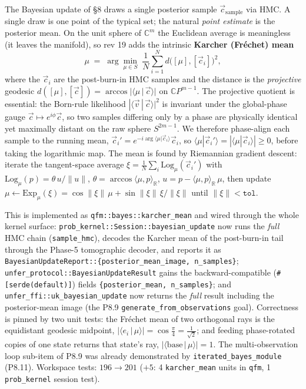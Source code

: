 \documentclass[11pt, a4paper]{article}
\newcommand{\Rset}{\mathbb{R}}
\newcommand{\Cset}{\mathbb{C}}
\begin{document}
The Bayesian update of \S8 draws a single posterior sample
$\vec c_{\mathrm{sample}}$ via HMC. A single draw is one point of
the typical set; the natural \emph{point estimate} is the
posterior mean. On the unit sphere of $\Cset^m$ the Euclidean
average is meaningless (it leaves the manifold), so rev 19 adds
the intrinsic \textbf{Karcher (Fr\'echet) mean}
\[
  \mu \;=\; \arg\min_{\mu \in S} \;\frac1N \sum_{i=1}^N
  d\bigl([\mu],[\vec c_i]\bigr)^2 ,
\]
where the $\vec c_i$ are the post-burn-in HMC samples and the
distance is the \emph{projective} geodesic
$d([\mu],[\vec c]) = \arccos|\langle \mu \,|\, \vec c\rangle|$ on
$\Cset P^{m-1}$. The projective quotient is essential: the
Born-rule likelihood $|\langle \vec v\,|\,\vec c\rangle|^2$ is
invariant under the global-phase gauge
$\vec c \mapsto e^{i\phi}\vec c$, so two samples differing only by
a phase are physically identical yet maximally distant on the raw
sphere $S^{2m-1}$. We therefore phase-align each sample to the
running mean, $\vec c_i' = e^{-i\arg\langle\mu|\vec c_i\rangle}
\vec c_i$, so $\langle\mu|\vec c_i'\rangle = |\langle\mu|\vec c_i
\rangle| \ge 0$, before taking the logarithmic map. The mean is
found by Riemannian gradient descent: iterate the tangent-space
average $\xi = \frac1N \sum_i \mathrm{Log}_\mu(\vec c_i')$ with
$\mathrm{Log}_\mu(p) = \theta\,u/\|u\|$, $\theta = \arccos\langle
\mu,p\rangle_\Rset$, $u = p - \langle\mu,p\rangle_\Rset\,\mu$,
then update $\mu \leftarrow \mathrm{Exp}_\mu(\xi) = \cos\|\xi\|
\,\mu + \sin\|\xi\|\,\xi/\|\xi\|$ until $\|\xi\| < \texttt{tol}$.

This is implemented as \texttt{qfm::bayes::karcher\_mean} and
wired through the whole kernel surface:
\texttt{prob\_kernel::Session::bayesian\_update} now runs the
\emph{full} HMC chain (\texttt{sample\_hmc}), decodes the Karcher
mean of the post-burn-in tail through the Phase-5 tomographic
decoder, and reports it as
\texttt{BayesianUpdateReport::\{posterior\_mean\_image,
n\_samples\}}; \texttt{unfer\_protocol::BayesianUpdateResult}
gains the backward-compatible (\texttt{\#[serde(default)]})
fields \texttt{\{posterior\_mean, n\_samples\}}; and
\texttt{unfer\_ffi::uk\_bayesian\_update} now returns the
\emph{full} result including the posterior-mean image (the P8.9
\texttt{generate\_from\_observations} goal). Correctness is pinned
by two unit tests: the Fr\'echet mean of two orthogonal rays is
the equidistant geodesic midpoint, $|\langle e_i \,|\, \mu\rangle|
= \cos\frac\pi4 = \tfrac1{\sqrt2}$; and feeding phase-rotated
copies of one state returns that state's ray,
$|\langle \mathrm{base} \,|\, \mu\rangle| = 1$. The multi-observation
loop sub-item of P8.9 was already demonstrated by
\texttt{iterated\_bayes\_module} (P8.11). Workspace tests:
$196 \to 201$ ($+5$: 4 \texttt{karcher\_mean} units in
\texttt{qfm}, 1 \texttt{prob\_kernel} session test).
\end{document}
